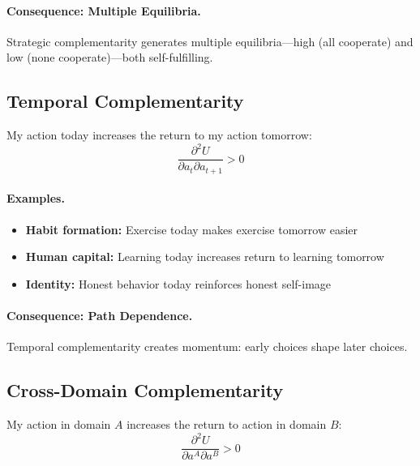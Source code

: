 \paragraph{Consequence: Multiple Equilibria.}
Strategic complementarity generates multiple equilibria---high (all cooperate)
and low (none cooperate)---both self-fulfilling.

\subsection{Temporal Complementarity}

\begin{definition}
My action today increases the return to my action tomorrow:
\begin{equation}
  \frac{\partial^2 U}{\partial a_t \partial a_{t+1}} > 0
\end{equation}
\end{definition}

\paragraph{Examples.}
\begin{itemize}[nosep]
  \item \textbf{Habit formation:} Exercise today makes exercise tomorrow easier
  \item \textbf{Human capital:} Learning today increases return to learning tomorrow
  \item \textbf{Identity:} Honest behavior today reinforces honest self-image
\end{itemize}

\paragraph{Consequence: Path Dependence.}
Temporal complementarity creates momentum: early choices shape later choices.

\subsection{Cross-Domain Complementarity}

\begin{definition}
My action in domain $A$ increases the return to action in domain $B$:
\begin{equation}
  \frac{\partial^2 U}{\partial a^A \partial a^B} > 0
\end{equation}
\end{definition}

